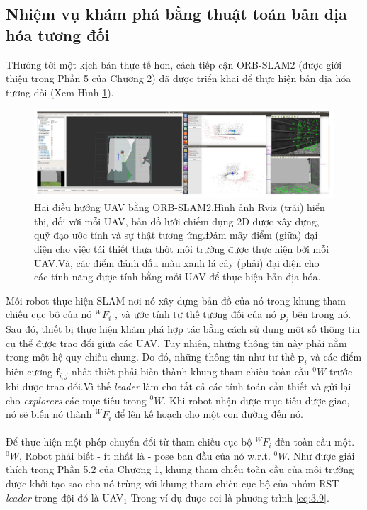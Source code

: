 \documentclass[11pt,openany]{book}
\begin{document}
\subsection{Nhiệm vụ khám phá bằng thuật toán bản địa hóa tương đối}
THướng tới một kịch bản thực tế hơn, cách tiếp cận ORB-SLAM2 (được giới thiệu trong Phần 5 của Chương 2) đã được triển khai để thực hiện bản địa hóa tương đối (Xem Hình \ref{fig:3.23}).
\begin{figure}[H]
    \centering
    \includegraphics[scale=0.3]{assets/3_23.png}
    \caption{Hai điều hướng UAV bằng ORB-SLAM2.Hình ảnh Rviz (trái) hiển thị, đối với mỗi UAV, bản đồ lưới chiếm dụng 2D được xây dựng, quỹ đạo ước tính và sự thật tương ứng.Đám mây điểm (giữa) đại diện cho việc tái thiết thưa thớt môi trường được thực hiện bởi mỗi UAV.Và, các điểm đánh dấu màu xanh lá cây (phải) đại diện cho các tính năng được tính bằng mỗi UAV để thực hiện bản địa hóa.}
    \label{fig:3.23}
\end{figure}
Mỗi robot thực hiện SLAM nơi nó xây dựng bản đồ của nó trong khung tham chiếu cục bộ của nó $^WF_i$ , và ước tính tư thế tương đối của nó $\mathbf{p}_i$ bên trong nó. Sau đó, thiết bị thực hiện khám phá hợp tác bằng cách sử dụng một số thông tin cụ thể được trao đổi giữa các UAV. Tuy nhiên, những thông tin này phải nằm trong một hệ quy chiếu chung. Do đó, những thông tin như tư thế $\mathbf{p}_i$ và các điểm biên cương $\mathbf{f}_{i,j}$ nhất thiết phải biến thành khung tham chiếu toàn cầu $^0W$ trước khi được trao đổi.Vì thế \textit{leader} làm cho tất cả các tính toán cần thiết và gửi lại cho \textit{explorers} các mục tiêu trong $^0W$. Khi robot nhận được mục tiêu được giao, nó sẽ biến nó thành $^WF_i$ để lên kế hoạch cho một con đường đến nó.\\\\
Để thực hiện một phép chuyển đổi từ tham chiếu cục bộ $^WF_i$ đến toàn cầu một. $^0W$, Robot phải biết - ít nhất là - pose ban đầu của nó w.r.t. $^0W$. Như được giải thích trong Phần 5.2 của Chương 1, khung tham chiếu toàn cầu của môi trường được khởi tạo sao cho nó trùng với khung tham chiếu cục bộ của nhóm RST-\textit{leader} trong đội đó là UAV$_1$ Trong ví dụ được coi là phương trình \ref{eq:3.9}.
\end{document}
